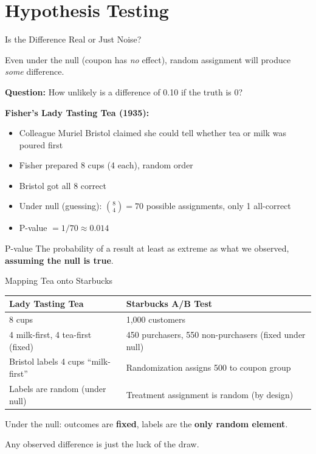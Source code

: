 \documentclass[aspectratio=169, 11pt, handout]{beamer}
\begin{document}
\section{Hypothesis Testing}

\begin{frame}{Is the Difference Real or Just Noise?}

Even under the null (coupon has \emph{no} effect), random assignment will produce \emph{some} difference.

\medskip

\textbf{Question:} How unlikely is a difference of 0.10 if the truth is 0?

\medskip
\pause

\textbf{Fisher's Lady Tasting Tea (1935):}
\begin{itemize}
    \item Colleague Muriel Bristol claimed she could tell whether tea or milk was poured first
    \item Fisher prepared 8 cups (4 each), random order
    \item Bristol got all 8 correct
    \item Under null (guessing): $\binom{8}{4} = 70$ possible assignments, only 1 all-correct
    \item P-value $= 1/70 \approx 0.014$
\end{itemize}

\medskip

\begin{block}{P-value}
The probability of a result at least as extreme as what we observed, \textbf{assuming the null is true}.
\end{block}
\end{frame}

\begin{frame}{Mapping Tea onto Starbucks}

\begin{center}
\begin{tabular}{ll}
\toprule
\textbf{Lady Tasting Tea} & \textbf{Starbucks A/B Test} \\
\midrule
8 cups & 1,000 customers \\
4 milk-first, 4 tea-first (fixed) & 450 purchasers, 550 non-purchasers (fixed under null) \\
Bristol labels 4 cups ``milk-first'' & Randomization assigns 500 to coupon group \\
Labels are random (under null) & Treatment assignment is random (by design) \\
\bottomrule
\end{tabular}
\end{center}

\bigskip
\pause

Under the null: outcomes are \textbf{fixed}, labels are the \textbf{only random element}.

\bigskip

Any observed difference is just the luck of the draw.
\end{frame}
\end{document}
